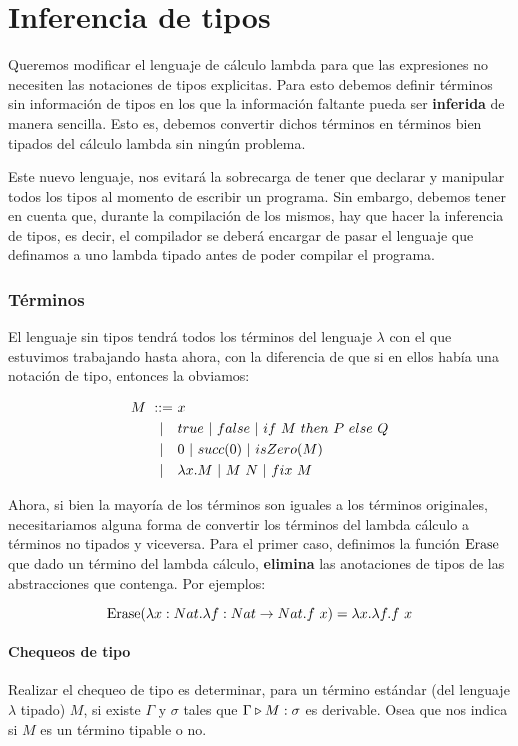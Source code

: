 \section{Inferencia de tipos}

Queremos modificar el lenguaje de cálculo lambda para que las expresiones no necesiten las notaciones de tipos explicitas. Para esto debemos definir términos sin información de tipos en los que la información faltante pueda ser \textbf{inferida} de manera sencilla. Esto es, debemos convertir dichos términos en términos bien tipados del cálculo lambda sin ningún problema.

Este nuevo lenguaje, nos evitará la sobrecarga de tener que declarar y manipular todos los tipos al momento de escribir un programa. Sin embargo, debemos tener en cuenta que, durante la compilación de los mismos, hay que hacer la inferencia de tipos, es decir, el compilador se deberá encargar de pasar el lenguaje que definamos a uno lambda tipado antes de poder compilar el programa.

\subsubsection*{Términos}
El lenguaje sin tipos tendrá todos los términos del lenguaje $\lambda$ con el que estuvimos trabajando hasta ahora, con la diferencia de que si en ellos había una notación de tipo, entonces la obviamos:

\begin{equation*}
\begin{split}
M~::=~&x \\
|~~~&true~|~false~|~if~ M~ then~ P~ else~ Q \\
|~~~&0~|~succ(0)~|~isZero(M) \\
|~~~& \lambda x. M~|~M~N~|~fix~M
\end{split}
\end{equation*}

Ahora, si bien la mayoría de los términos son iguales a los términos originales, necesitariamos alguna forma de convertir los términos del lambda cálculo a términos no tipados y viceversa. Para el primer caso, definimos la función $\operatorname{Erase}$ que dado un término del lambda cálculo, \textbf{elimina} las anotaciones de tipos de las abstracciones que contenga. Por ejemplos: 

$$\operatorname{Erase}(\lambda x: Nat . \lambda f: Nat\to Nat . f~x) = \lambda x. \lambda f. f~x$$

\paragraph{Chequeos de tipo}
Realizar el chequeo de tipo es determinar, para un término estándar (del lenguaje $\lambda$ tipado) $M$, si existe $\Gamma$ y $\sigma$ tales que $\Gamma\triangleright M : \sigma$ es derivable. Osea que nos indica si $M$ es un término tipable o no.

